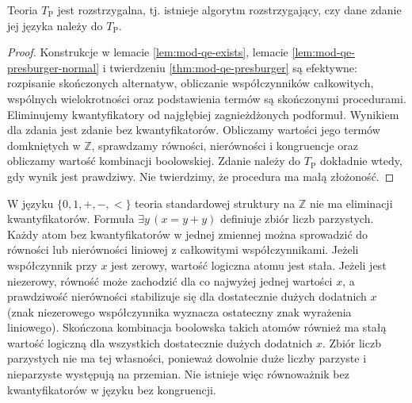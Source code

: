 \begin{wniosek}[Rozstrzygalność]
\label{cor:mod-qe-presburger-decidable}
Teoria $T_{\mathrm P}$ jest rozstrzygalna, tj. istnieje
algorytm rozstrzygający, czy dane zdanie jej języka
należy do $T_{\mathrm P}$.
\end{wniosek}
\begin{proof}
Konstrukcje w lemacie \ref{lem:mod-qe-exists}, lemacie
\ref{lem:mod-qe-presburger-normal} i twierdzeniu
\ref{thm:mod-qe-presburger} są efektywne: rozpisanie
skończonych alternatyw, obliczanie współczynników
całkowitych, wspólnych wielokrotności oraz podstawienia
termów są skończonymi procedurami. Eliminujemy kwantyfikatory
od najgłębiej zagnieżdżonych podformuł. Wynikiem dla
zdania jest zdanie bez kwantyfikatorów. Obliczamy wartości
jego termów domkniętych w $\mathbb Z$, sprawdzamy
równości, nierówności i kongruencje oraz obliczamy
wartość kombinacji boolowskiej. Zdanie należy do
$T_{\mathrm P}$ dokładnie wtedy, gdy wynik jest prawdziwy.
Nie twierdzimy, że procedura ma małą złożoność.
\end{proof}

\begin{przyklad}
\label{ex:mod-qe-presburger-no-congruence}
W języku $\{0,1,+,-,<\}$ teoria standardowej struktury
na $\mathbb Z$ nie ma eliminacji kwantyfikatorów.
Formuła $\exists y\,(x=y+y)$ definiuje zbiór liczb
parzystych. Każdy atom bez kwantyfikatorów w jednej
zmiennej można sprowadzić do równości lub nierówności
liniowej z całkowitymi współczynnikami.
Jeżeli współczynnik przy $x$ jest zerowy, wartość
logiczna atomu jest stała. Jeżeli jest niezerowy,
równość może zachodzić dla co najwyżej jednej
wartości $x$, a prawdziwość nierówności stabilizuje
się dla dostatecznie dużych dodatnich $x$ (znak
niezerowego współczynnika wyznacza ostateczny znak
wyrażenia liniowego).
Skończona kombinacja boolowska takich atomów również
ma stałą wartość logiczną dla wszystkich dostatecznie
dużych dodatnich $x$. Zbiór liczb parzystych nie ma
tej własności, ponieważ dowolnie duże liczby parzyste
i nieparzyste występują na przemian. Nie istnieje więc
równoważnik bez kwantyfikatorów w języku bez kongruencji.
\end{przyklad}

